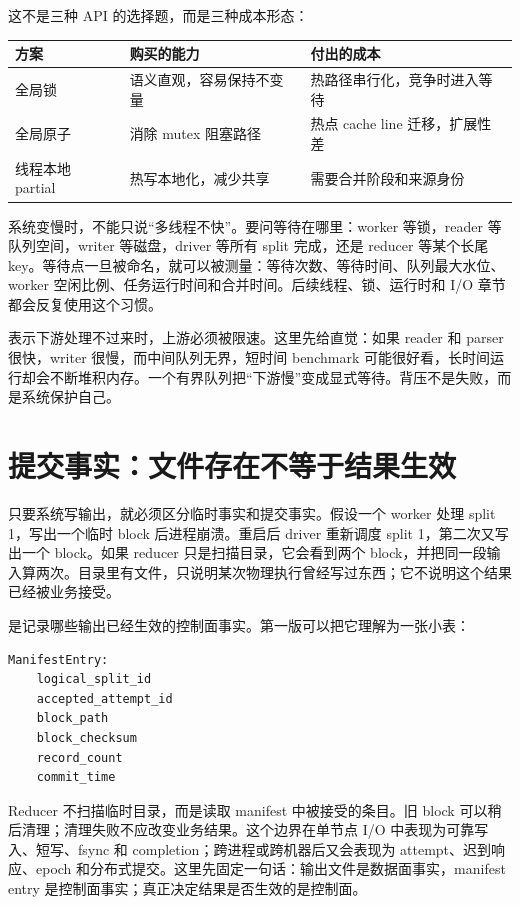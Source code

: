 这不是三种 API 的选择题，而是三种成本形态：

\begin{center}
\begin{tabular}{lll}
\toprule
方案 & 购买的能力 & 付出的成本 \\
\midrule
全局锁 & 语义直观，容易保持不变量 & 热路径串行化，竞争时进入等待 \\
全局原子 & 消除 mutex 阻塞路径 & 热点 cache line 迁移，扩展性差 \\
线程本地 partial & 热写本地化，减少共享 & 需要合并阶段和来源身份 \\
\bottomrule
\end{tabular}
\end{center}

系统变慢时，不能只说“多线程不快”。要问等待在哪里：worker 等锁，reader 等队列空间，writer 等磁盘，driver 等所有 split 完成，还是 reducer 等某个长尾 key。等待点一旦被命名，就可以被测量：等待次数、等待时间、队列最大水位、worker 空闲比例、任务运行时间和合并时间。后续线程、锁、运行时和 I/O 章节都会反复使用这个习惯。

 表示下游处理不过来时，上游必须被限速。这里先给直觉：如果 reader 和 parser 很快，writer 很慢，而中间队列无界，短时间 benchmark 可能很好看，长时间运行却会不断堆积内存。一个有界队列把“下游慢”变成显式等待。背压不是失败，而是系统保护自己。

\section{提交事实：文件存在不等于结果生效}

只要系统写输出，就必须区分临时事实和提交事实。假设一个 worker 处理 split 1，写出一个临时 block 后进程崩溃。重启后 driver 重新调度 split 1，第二次又写出一个 block。如果 reducer 只是扫描目录，它会看到两个 block，并把同一段输入算两次。目录里有文件，只说明某次物理执行曾经写过东西；它不说明这个结果已经被业务接受。

 是记录哪些输出已经生效的控制面事实。第一版可以把它理解为一张小表：

\begin{lstlisting}[numbers=none,caption={manifest 的语义伪结构}]
ManifestEntry:
    logical_split_id
    accepted_attempt_id
    block_path
    block_checksum
    record_count
    commit_time
\end{lstlisting}

Reducer 不扫描临时目录，而是读取 manifest 中被接受的条目。旧 block 可以稍后清理；清理失败不应改变业务结果。这个边界在单节点 I/O 中表现为可靠写入、短写、fsync 和 completion；跨进程或跨机器后又会表现为 attempt、迟到响应、epoch 和分布式提交。这里先固定一句话：输出文件是数据面事实，manifest entry 是控制面事实；真正决定结果是否生效的是控制面。


